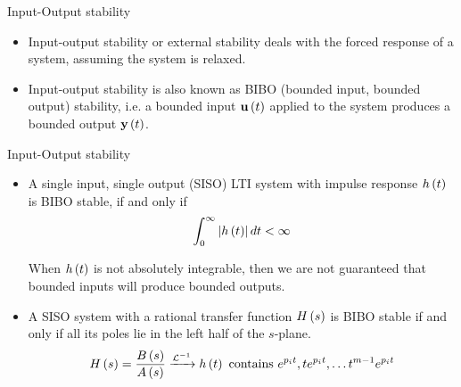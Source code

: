 \documentclass[aspectratio=169]{beamer}
\def\mf{\ensuremath\mathbf}
\def\lp{\ensuremath\left(}
\def\rp{\ensuremath\right)}
\def\lv{\ensuremath\left\lvert}
\def\rv{\ensuremath\right\rvert}
\def\ls{\ensuremath\left[}
\def\rs{\ensuremath\right]}
\def\bmx{\ensuremath\begin{bmatrix*}[r]}
\def\emx{\ensuremath\end{bmatrix*}}
\newcommand{\ct}[1]{\lp #1\rp}
\newcommand{\dt}[1]{\ls #1\rs}
\begin{document}




\begin{frame}[t]{Input-Output stability}
\begin{itemize}
    \item Input-output stability or external stability deals with the forced response of a system, assuming the system is relaxed.

    \item Input-output stability is also known as BIBO (bounded input, bounded output) stability, i.e. a bounded input $\mf{u}\ct{t}$ applied to the system produces a bounded output $\mf{y}\ct{t}$.
\end{itemize}
\end{frame}


\begin{frame}[t]{Input-Output stability}
\begin{itemize}
    \item A single input, single output (SISO) LTI system with impulse response $h\ct{t}$ is BIBO stable, if and only if
    \[ \int_{0}^{\infty} \lv h\ct{t}\rv dt < \infty \]

    When $h\ct{t}$ is not absolutely integrable, then we are not guaranteed that bounded inputs will produce bounded outputs.

    \item A SISO system with a rational transfer function $H\ct{s}$ is BIBO stable if and only if all its poles lie in the left half of the $s$-plane.
    \[ H\ct{s} = \frac{B\ct{s}}{A\ct{s}} \xrightarrow{\mathcal{L}^{-1}} h\ct{t} \text{ contains } e^{p_i t}, te^{p_i t}, \ldots t^{m-1}e^{p_i t}\]
\end{itemize}
\end{frame}
\end{document}
